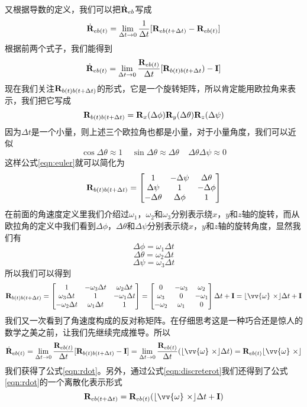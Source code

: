 \documentclass[11pt]{article}
\begin{document}
又根据导数的定义，我们可以把$\dot{{\bf R}}_{eb}$写成
$$
\dot{{\bf R}}_{eb(t)} = \lim_{\Delta t \to 0}\frac{1}{\Delta t}[{\bf R}_{eb(t+\Delta t)} - {\bf R}_{eb(t)}]
$$
根据前两个式子，我们能得到
$$
\dot{{\bf R}}_{eb(t)} = \lim_{\Delta t \to 0}\frac{{\bf R}_{eb(t)}}{\Delta t}[{\bf R}_{b(t)b(t+\Delta t}) - {\bf I}]
$$
现在我们关注${\bf R}_{b(t)b(t+\Delta t)}$的形式，它是一个旋转矩阵，所以肯定能用欧拉角来表示，我们把它写成
$$
{\bf R}_{b(t)b(t+\Delta t)} = {\bf R}_x(\Delta\phi){\bf R}_y(\Delta\theta){\bf R}_z(\Delta\psi)
$$
因为$\Delta t$是一个小量，则上述三个欧拉角也都是小量，对于小量角度，我们可以近似
$$
\cos\Delta\theta \approx 1 \ \ \ \ \ \sin\Delta\theta \approx \Delta\theta \ \ \ \ \ \Delta\theta\Delta\psi \approx 0
$$
这样公式\ref{eqn:euler}就可以简化为
$$
{\bf R}_{b(t)b(t+\Delta t)} =
\begin{bmatrix}
1 & -\Delta\psi & \Delta\theta\\
\Delta\psi & 1 & -\Delta\phi \\
-\Delta\theta & \Delta\phi & 1
\end{bmatrix} 
$$
在前面的角速度定义里我们介绍过$\omega_1$，$\omega_2$和$\omega_3$分别表示绕$x$，$y$和$z$轴的旋转，而从欧拉角的定义中我们看到$\Delta\phi$，$\Delta\theta$和$\Delta\psi$分别表示绕$x$，$y$和$z$轴的旋转角度，显然我们有
$$
\Delta\phi = \omega_1\Delta t
$$
$$
\Delta\theta = \omega_2\Delta t
$$
$$
\Delta\psi = \omega_3\Delta t
$$
所以我们可以得到
$$
{\bf R}_{b(t)b(t+\Delta t)} =
\begin{bmatrix}
1 & -\omega_3\Delta t & \omega_2\Delta t\\
\omega_3\Delta t & 1 & -\omega_1\Delta t \\
-\omega_2\Delta t & \omega_1\Delta t & 1
\end{bmatrix} 
= 
\begin{bmatrix}
0 & -\omega_3 & \omega_2\\
\omega_3 & 0 & -\omega_1 \\
-\omega_2 & \omega_1 & 0
\end{bmatrix}\Delta t + {\bf I} 
=
\lfloor \vv{\omega} \ \times \rfloor \Delta t + {\bf I} 
$$
我们又一次看到了角速度构成的反对称矩阵。在仔细思考这是一种巧合还是惊人的数学之美之前，让我们先继续完成推导。所以
$$
\dot{{\bf R}}_{eb(t)} = 
\lim_{\Delta t \to 0}\frac{{\bf R}_{eb(t)}}{\Delta t}[{\bf R}_{b(t)b(t+\Delta t)} - {\bf I}] 
=
\lim_{\Delta t \to 0}\frac{{\bf R}_{eb(t)}}{\Delta t}(\lfloor \vv{\omega} \ \times \rfloor \Delta t)
=
{\bf R}_{eb(t)}\lfloor \vv{\omega} \ \times \rfloor
$$
我们获得了公式\ref{eqn:rdot}。另外，通过公式\ref{eqn:discreterot}我们还得到了公式\ref{eqn:rdot}的一个离散化表示形式
\begin{equation}\label{eqn:discreterdot_euler}
{\bf R}_{eb(t+\Delta t)} = {\bf R}_{eb(t)}(\lfloor \vv{\omega} \ \times \rfloor \Delta t + {\bf I})
\end{equation}
\end{document}
